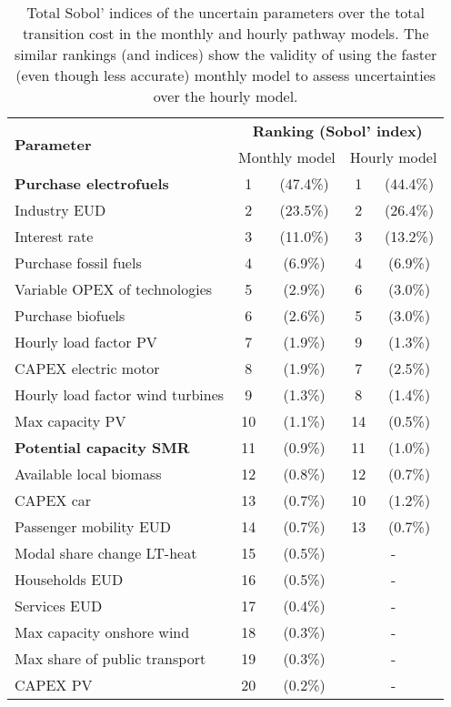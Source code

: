 \begin{table}[htbp!]
\caption{Total Sobol' indices of the uncertain parameters over the total transition cost in the monthly and hourly pathway models. The similar rankings (and indices) show the validity of using the faster (even though less accurate) monthly model to assess uncertainties over the hourly model.}
\label{tab:UQ_full}
\centering
\begin{tabular}{l c c| c c}
\toprule
\multirow{2}{*}{\textbf{Parameter}}  & \multicolumn{4}{c}{\textbf{Ranking (Sobol' index)}}\\
 & \multicolumn{2}{c|}{Monthly model} 	& \multicolumn{2}{c}{Hourly model} \\ 	
\midrule
\textbf{Purchase electrofuels} & 1 & (47.4\%) & 1 & (44.4\%) \\
Industry EUD & 2 & (23.5\%) & 2 & (26.4\%)  \\
Interest rate & 3 & (11.0\%) &  3 & (13.2\%)  \\
Purchase fossil fuels  & 4 & (6.9\%) & 4 & (6.9\%)   \\
\midrule
Variable OPEX of technologies & 5 & (2.9\%) & 6 & (3.0\%) \\
Purchase biofuels & 6 & (2.6\%) & 5 & (3.0\%) \\
Hourly load factor PV & 7 & (1.9\%) & 9 & (1.3\%) \\
CAPEX electric motor & 8 & (1.9\%) & 7 & (2.5\%) \\
Hourly load factor wind turbines & 9 & (1.3\%) & 8 & (1.4\%) \\
Max capacity PV & 10 & (1.1\%) & 14 & (0.5\%) \\
\textbf{Potential capacity \gls{SMR}} & 11 & (0.9\%) & 11 & (1.0\%) \\
Available local biomass & 12 & (0.8\%) & 12 & (0.7\%) \\
CAPEX car & 13 & (0.7\%) & 10 & (1.2\%) \\
Passenger mobility EUD & 14 & (0.7\%) & 13 & (0.7\%) \\
\midrule
Modal share change LT-heat & 15 & (0.5\%) & \multicolumn{2}{c}{-} \\
Households EUD & 16 & (0.5\%) & \multicolumn{2}{c}{-} \\
Services EUD & 17 & (0.4\%) & \multicolumn{2}{c}{-} \\
Max capacity onshore wind & 18 & (0.3\%) & \multicolumn{2}{c}{-} \\
Max share of public transport & 19 & (0.3\%) & \multicolumn{2}{c}{-} \\
CAPEX PV & 20 & (0.2\%) & \multicolumn{2}{c}{-} \\

\end{tabular}
\end{table}
